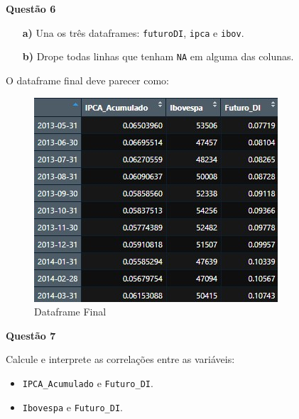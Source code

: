 \documentclass[12pt, a4paper]{article}
\begin{document}
 

\textbf{Questão 6}

\begin{itemize}
	\item[\textbf{a)}] Una os três dataframes: \texttt{futuroDI}, \texttt{ipca} e \texttt{ibov}.
	
	\item[\textbf{b)}] Drope todas linhas que tenham \texttt{NA} em alguma das colunas.
\end{itemize}

O dataframe final deve parecer como:

	\begin{figure}[H]
	\caption{Dataframe Final}
	\centering
	\includegraphics[scale=.63]{images/df.jpg}
\end{figure}



\textbf{Questão 7}

Calcule e interprete as correlações entre as variáveis:

\begin{itemize}
	\item \texttt{IPCA\_Acumulado} e \texttt{Futuro\_DI}.
	\item \texttt{Ibovespa} e \texttt{Futuro\_DI}.
\end{itemize}

	
\end{document}
